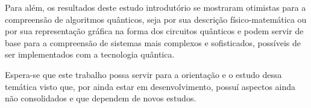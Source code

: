Para além, os resultados deste estudo introdutório se mostraram otimistas para a compreensão de algoritmos quânticos, seja por sua descrição físico-matemática ou por sua representação gráfica na forma dos circuitos quânticos e podem servir de base para a compreensão de sistemas mais complexos e sofisticados, possíveis de ser implementados com a tecnologia quântica.

Espera-se que este trabalho possa servir para a orientação e o estudo dessa temática visto que, por ainda estar em desenvolvimento, possuí aspectos ainda não consolidados e que dependem de novos estudos.

 




